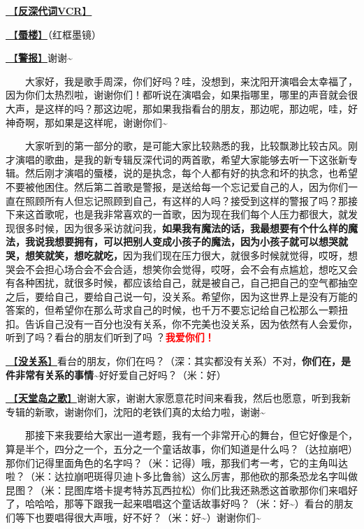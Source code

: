 \documentclass[]{ctexbook}
\begin{document}
\hyperref[senself-vcr]{🎥【\textbf{反深代词VCR}】}

\hyperref[mirage]{🎵【\textbf{蜃楼}】}（红框墨镜）

\hyperref[the-giver]{🎵【\textbf{警报}】}谢谢\textasciitilde{}

  大家好，我是歌手周深，你们好吗？哇，没想到，来沈阳开演唱会太幸福了，因为你们太热烈啦，谢谢你们！都听说在演唱会，如果指哪里，哪里的声音就会很大声，是这样的吗？那这边呢，那如果我指看台的朋友，那边呢，那边呢，哇，好神奇啊，那如果是这样呢，谢谢你们\textasciitilde{}

  大家听到的第一部分的歌，是可能大家比较熟悉的我，比较飘渺比较古风。刚才演唱的歌曲，是我的新专辑反深代词的两首歌，希望大家能够去听一下这张新专辑。然后刚才演唱的蜃楼，说的是执念，每个人都有好的执念和坏的执念，也希望不要被他困住。然后第二首歌是警报，是送给每一个忘记爱自己的人，因为你们一直在照顾所有人但忘记照顾到自己，有这样的人吗？接受到这样的警报了吗？那接下来这首歌呢，也是我非常喜欢的一首歌，因为现在我们每个人压力都很大，就发现很多时候，因为很多采访就问我，\textbf{如果我有魔法的话，我最想要有个什么样的魔法，我说我想要拥有，可以把别人变成小孩子的魔法，因为小孩子就可以想哭就哭，想笑就笑，想吃就吃，}因为我们现在压力很大，就很多时候就觉得，哎呀，想哭会不会担心场合会不会合适，想笑你会觉得，哎呀，会不会有点尴尬，想吃又会有各种困扰，就很多时候，都应该给自己，就是被自己，自己把自己的空气都抽空之后，要给自己，要给自己说一句，没关系。希望你，因为这世界上是没有万能的答案的，但希望你在那么苛求自己的时候，也千万不要忘记给自己松那么一颗扭扣。告诉自己没有一百分也没有关系，你不完美也没关系，因为依然有人会爱你，听到了吗？看台的朋友们听到了吗 ？\textbf{\textcolor{red}{我爱你们！}}

\hyperref[life-is-like-a-box-of-chocolates]{🎵【\textbf{没关系}】}看台的朋友，你们在吗？（深：其实都没有关系）不对，\textbf{你们在，是件非常有关系的事情\textasciitilde{}}好好爱自己好吗？（米：好）

\hyperref[haven-song]{🎵【\textbf{天堂岛之歌}】}谢谢大家，谢谢大家愿意花时间来看我，然后也愿意，听到我新专辑的新歌，谢谢你们，沈阳的老铁们真的太给力啦，谢谢\textasciitilde{}

  那接下来我要给大家出一道考题，我有一个非常开心的舞台，但它好像是个，算是半个，四分之一个，五分之一个童话故事，你们知道是什么吗？（达拉崩吧）那你们记得里面角色的名字吗？（米：记得）哦，那我们考一考，它的主角叫达啦？（米：达拉崩吧斑得贝迪卜多比鲁翁）这么厉害，那他砍的那条恐龙名字叫做昆图？（米：昆图库塔卡提考特苏瓦西拉松）你们比我还熟悉这首歌那你们来唱好了，哈哈哈，那等下跟我一起来唱唱这个童话故事好吗？（米：好\textasciitilde）看台的朋友们等下也要唱得很大声哦，好不好？（米：好\textasciitilde）谢谢你们\textasciitilde{}
\end{document}
